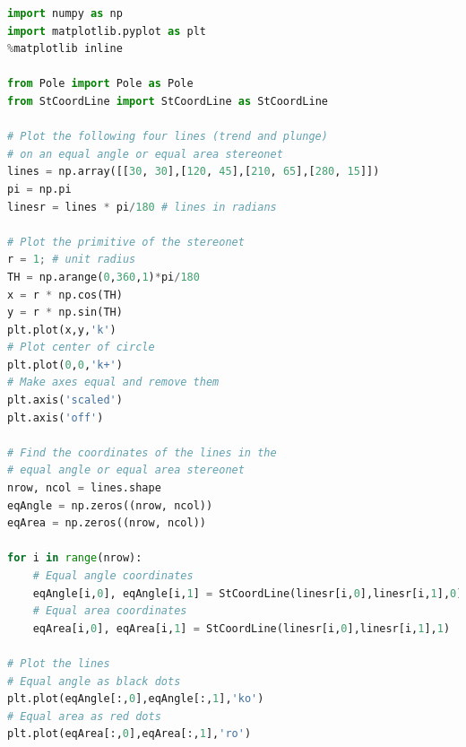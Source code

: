 \documentclass[a4paper , 12pt]{book}
\begin{document}
\begin{center}
\begin{lstlisting}[language=Python, frame=single]
import numpy as np
import matplotlib.pyplot as plt
%matplotlib inline

from Pole import Pole as Pole
from StCoordLine import StCoordLine as StCoordLine

# Plot the following four lines (trend and plunge)
# on an equal angle or equal area stereonet
lines = np.array([[30, 30],[120, 45],[210, 65],[280, 15]])
pi = np.pi
linesr = lines * pi/180 # lines in radians

# Plot the primitive of the stereonet
r = 1; # unit radius
TH = np.arange(0,360,1)*pi/180
x = r * np.cos(TH)
y = r * np.sin(TH)
plt.plot(x,y,'k')
# Plot center of circle
plt.plot(0,0,'k+')
# Make axes equal and remove them
plt.axis('scaled')
plt.axis('off')

# Find the coordinates of the lines in the
# equal angle or equal area stereonet
nrow, ncol = lines.shape
eqAngle = np.zeros((nrow, ncol))
eqArea = np.zeros((nrow, ncol))

for i in range(nrow):
    # Equal angle coordinates
    eqAngle[i,0], eqAngle[i,1] = StCoordLine(linesr[i,0],linesr[i,1],0) 
    # Equal area coordinates
    eqArea[i,0], eqArea[i,1] = StCoordLine(linesr[i,0],linesr[i,1],1)
    
# Plot the lines
# Equal angle as black dots
plt.plot(eqAngle[:,0],eqAngle[:,1],'ko')
# Equal area as red dots
plt.plot(eqArea[:,0],eqArea[:,1],'ro')
\end{lstlisting}
\end{center}
\end{document}
